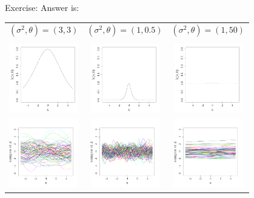 \begin{frame}{}
\begin{exampleblock}{Exercise: }
Answer is:
\begin{center}
\begin{tabular}{ccc}
$(\sigma^2,\theta) = (3,3)$& $(\sigma^2,\theta)=(1,0.5)$& $(\sigma^2,\theta)=(1,50)$ \\
&&\\
\includegraphics[height=3cm]{1_stat_models/figures/R/MVN_kern33} &\includegraphics[height=3cm]{1_stat_models/figures/R/MVN_kern105}& \includegraphics[height=3cm]{1_stat_models/figures/R/MVN_kern150}\\
\includegraphics[height=3cm]{1_stat_models/figures/R/MVN_traj33} &\includegraphics[height=3cm]{1_stat_models/figures/R/MVN_traj105}& \includegraphics[height=3cm]{1_stat_models/figures/R/MVN_traj150}
\end{tabular}
\end{center}
\end{exampleblock}
\end{frame}

